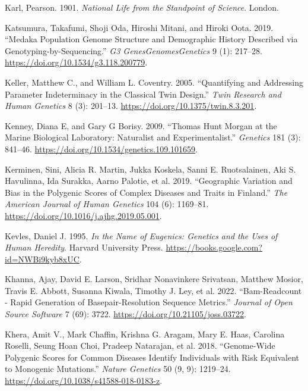 \documentclass[
]{book}
\newlength{\cslhangindent}
\newlength{\cslentryspacingunit} %
\newenvironment{CSLReferences}[2] %
 {%
  \setlength{\parindent}{0pt}
  \ifodd #1
  \let\oldpar\par
  \def\par{\hangindent=\cslhangindent\oldpar}
  \fi
  \setlength{\parskip}{#2\cslentryspacingunit}
 }%
 {}
\begin{document}
\begin{CSLReferences}{1}{0}
\leavevmode{}%
Karl, Pearson. 1901. \emph{National {Life} from the Standpoint of {Science}}. {London}.

\leavevmode{}%
Katsumura, Takafumi, Shoji Oda, Hiroshi Mitani, and Hiroki Oota. 2019. {``Medaka {Population Genome Structure} and {Demographic History Described} via {Genotyping-by-Sequencing}.''} \emph{G3 Genes\textbar Genomes\textbar Genetics} 9 (1): 217--28. \url{https://doi.org/10.1534/g3.118.200779}.

\leavevmode{}%
Keller, Matthew C., and William L. Coventry. 2005. {``Quantifying and {Addressing Parameter Indeterminacy} in the {Classical Twin Design}.''} \emph{Twin Research and Human Genetics} 8 (3): 201--13. \url{https://doi.org/10.1375/twin.8.3.201}.

\leavevmode{}%
Kenney, Diana E, and Gary G Borisy. 2009. {``Thomas {Hunt Morgan} at the {Marine Biological Laboratory}: {Naturalist} and {Experimentalist}.''} \emph{Genetics} 181 (3): 841--46. \url{https://doi.org/10.1534/genetics.109.101659}.

\leavevmode{}%
Kerminen, Sini, Alicia R. Martin, Jukka Koskela, Sanni E. Ruotsalainen, Aki S. Havulinna, Ida Surakka, Aarno Palotie, et al. 2019. {``Geographic {Variation} and {Bias} in the {Polygenic Scores} of {Complex Diseases} and {Traits} in {Finland}.''} \emph{The American Journal of Human Genetics} 104 (6): 1169--81. \url{https://doi.org/10.1016/j.ajhg.2019.05.001}.

\leavevmode{}%
Kevles, Daniel J. 1995. \emph{In the {Name} of {Eugenics}: {Genetics} and the {Uses} of {Human Heredity}}. {Harvard University Press}. \url{https://books.google.com?id=NWBi9kyb8xUC}.

\leavevmode{}%
Khanna, Ajay, David E. Larson, Sridhar Nonavinkere Srivatsan, Matthew Mosior, Travis E. Abbott, Susanna Kiwala, Timothy J. Ley, et al. 2022. {``Bam-Readcount - Rapid Generation of Basepair-Resolution Sequence Metrics.''} \emph{Journal of Open Source Software} 7 (69): 3722. \url{https://doi.org/10.21105/joss.03722}.

\leavevmode{}%
Khera, Amit V., Mark Chaffin, Krishna G. Aragam, Mary E. Haas, Carolina Roselli, Seung Hoan Choi, Pradeep Natarajan, et al. 2018. {``Genome-Wide Polygenic Scores for Common Diseases Identify Individuals with Risk Equivalent to Monogenic Mutations.''} \emph{Nature Genetics} 50 (9, 9): 1219--24. \url{https://doi.org/10.1038/s41588-018-0183-z}.


\end{CSLReferences}
\end{document}
